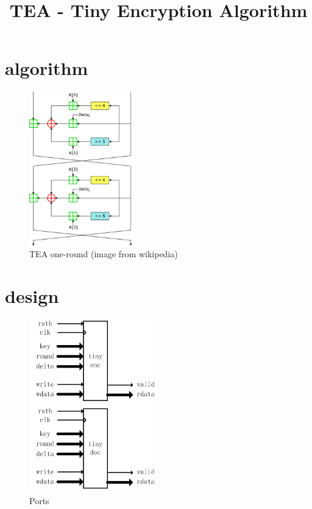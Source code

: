 \documentclass[10pt]{article}
\begin{document}
\title{TEA - Tiny Encryption Algorithm}
\maketitle
\tableofcontents



\section{algorithm}

\begin{figure}[H]
\centering
\includegraphics[width=0.4\textwidth]{TEA_InfoBox_Diagram.png}
\caption{TEA one-round (image from wikipedia)}
\label{TEA_InfoBox_Diagram.png}
\end{figure}



\section{design}

\begin{figure}[H]
\centering
\includegraphics[width=0.5\textwidth]{20250808173800_719x962_scrot.png}
\caption{Ports}
\label{20250808173800_719x962_scrot.png}
\end{figure}
\end{document}
